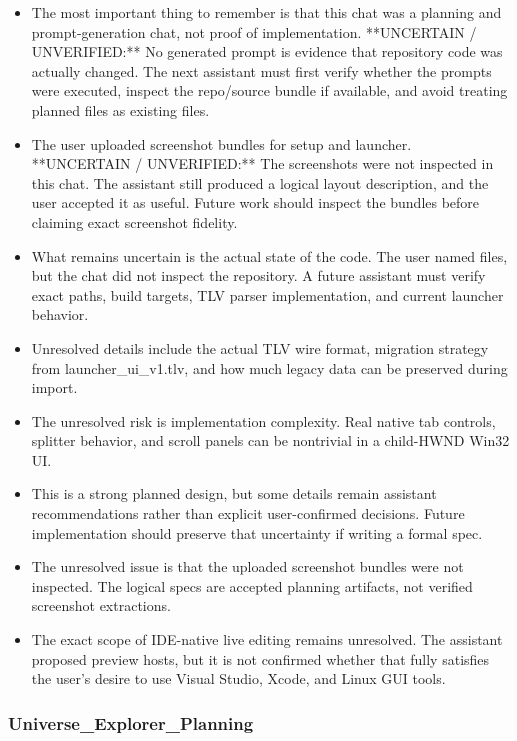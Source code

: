 \documentclass[11pt,a4paper]{report}
\begin{document}
\begin{itemize}
\item The most important thing to remember is that this chat was a planning and prompt-generation chat, not proof of implementation. **UNCERTAIN / UNVERIFIED:** No generated prompt is evidence that repository code was actually changed. The next assistant must first verify whether the prompts were executed, inspect the repo/source bundle if available, and avoid treating planned files as existing files.
\item The user uploaded screenshot bundles for setup and launcher. **UNCERTAIN / UNVERIFIED:** The screenshots were not inspected in this chat. The assistant still produced a logical layout description, and the user accepted it as useful. Future work should inspect the bundles before claiming exact screenshot fidelity.
\item What remains uncertain is the actual state of the code. The user named files, but the chat did not inspect the repository. A future assistant must verify exact paths, build targets, TLV parser implementation, and current launcher behavior.
\item Unresolved details include the actual TLV wire format, migration strategy from launcher\_ui\_v1.tlv, and how much legacy data can be preserved during import.
\item The unresolved risk is implementation complexity. Real native tab controls, splitter behavior, and scroll panels can be nontrivial in a child-HWND Win32 UI.
\item This is a strong planned design, but some details remain assistant recommendations rather than explicit user-confirmed decisions. Future implementation should preserve that uncertainty if writing a formal spec.
\item The unresolved issue is that the uploaded screenshot bundles were not inspected. The logical specs are accepted planning artifacts, not verified screenshot extractions.
\item The exact scope of IDE-native live editing remains unresolved. The assistant proposed preview hosts, but it is not confirmed whether that fully satisfies the user's desire to use Visual Studio, Xcode, and Linux GUI tools.
\end{itemize}

\subsubsection{Universe\_Explorer\_Planning}
\end{document}
